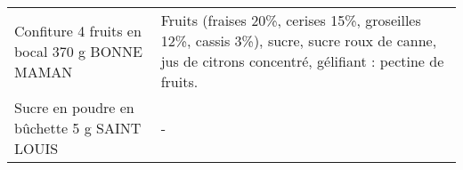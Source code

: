 \begin{longtable}{p{5cm}p{10cm}}
                                                            Confiture 4 fruits en bocal 370 g BONNE MAMAN &                                                                                                                                                                                                                                                                                                                                                                                                                                                                                                                                                                                                                                                                                                                                                                                                                                                                                       Fruits (fraises 20\%, cerises 15\%, groseilles 12\%, cassis 3\%), sucre, sucre roux de canne, jus de citrons concentré, gélifiant : pectine de fruits. \\
                                                              Sucre en poudre en bûchette 5 g SAINT LOUIS &                                                                                                                                                                                                                                                                                                                                                                                                                                                                                                                                                                                                                                                                                                                                                                                                                                                                                                                                                                                                                                        - \\

\end{longtable}

